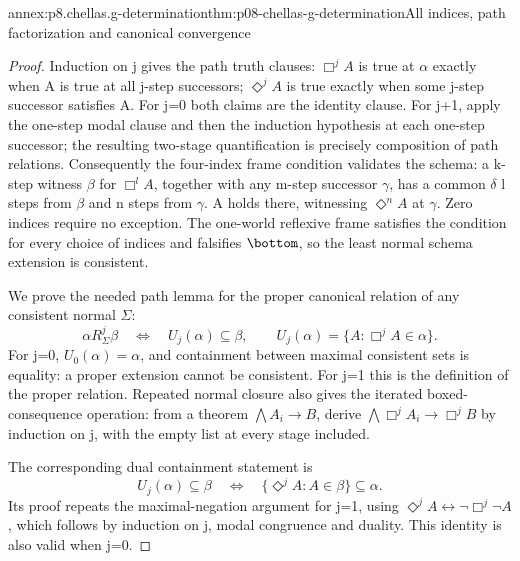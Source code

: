 \begin{annexitem}{annex:p8.chellas.g-determination}{thm:p08-chellas-g-determination}{All indices, path factorization and canonical convergence}
\begin{proof}
Induction on j gives the path truth clauses: \(\Box^j A\) is
true at \(\alpha\) exactly when A is true at all j-step successors;
\(\Diamond^j A\) is true exactly when some j-step successor
satisfies A. For j=0 both claims are the identity clause. For j+1,
apply the one-step modal clause and then the induction hypothesis
at each one-step successor; the resulting two-stage quantification
is precisely composition of path relations. Consequently the
four-index frame condition validates the schema: a k-step witness
\(\beta\) for \(\Box^l A\), together with any m-step successor
\(\gamma\), has a common \(\delta\) l steps from \(\beta\)
and n steps from \(\gamma\). A holds there, witnessing
\(\Diamond^n A\) at \(\gamma\). Zero indices require no exception.
The one-world reflexive frame satisfies the condition for every
choice of indices and falsifies \(\bottom\), so the least normal
schema extension is consistent.

We prove the needed path lemma for the proper canonical relation of
any consistent normal \(\Sigma\):
\[
 \alpha R_\Sigma^j\beta
 \quad\Longleftrightarrow\quad
 U_j(\alpha)\subseteq\beta,
 \qquad U_j(\alpha)=\{A:\Box^j A\in\alpha\}.
\]
For j=0, \(U_0(\alpha)=\alpha\), and containment between maximal
consistent sets is equality: a proper extension cannot be consistent.
For j=1 this is the definition of the proper relation. Repeated
normal closure also gives the iterated boxed-consequence operation:
from a theorem \(\bigwedge A_i\to B\), derive
\(\bigwedge\Box^j A_i\to\Box^j B\) by induction on j, with
the empty list at every stage included.

The corresponding dual containment statement is
\[
 U_j(\alpha)\subseteq\beta
 \quad\Longleftrightarrow\quad
 \{\Diamond^j A:A\in\beta\}\subseteq\alpha.
\]
Its proof repeats the maximal-negation argument for j=1, using
\(\Diamond^j A\leftrightarrow\neg\Box^j\neg A\), which follows
by induction on j, modal congruence and duality. This identity is
also valid when j=0.


\end{proof}
\end{annexitem}
